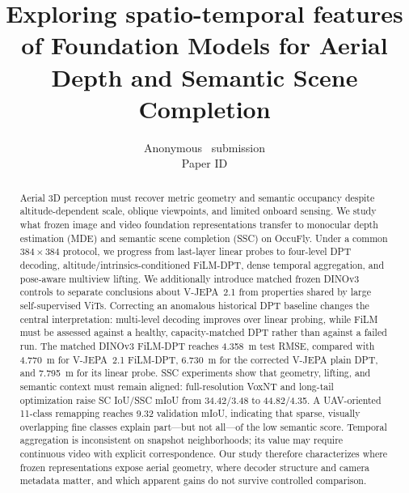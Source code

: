 \documentclass[10pt,twocolumn,letterpaper]{article}
\title{Exploring spatio-temporal features of Foundation Models for Aerial Depth and Semantic Scene Completion}
\author{Anonymous \confName~submission\\Paper ID \wacvPaperID}
\begin{document}
\maketitle
\begin{abstract}
Aerial 3D perception must recover metric geometry and semantic occupancy despite altitude-dependent scale, oblique viewpoints, and limited onboard sensing. We study what frozen image and video foundation representations transfer to monocular depth estimation (MDE) and semantic scene completion (SSC) on OccuFly. Under a common $384\!\times\!384$ protocol, we progress from last-layer linear probes to four-level DPT decoding, altitude/intrinsics-conditioned FiLM-DPT, dense temporal aggregation, and pose-aware multiview lifting. We additionally introduce matched frozen DINOv3 controls to separate conclusions about V-JEPA~2.1 from properties shared by large self-supervised ViTs. Correcting an anomalous historical DPT baseline changes the central interpretation: multi-level decoding improves over linear probing, while FiLM must be assessed against a healthy, capacity-matched DPT rather than against a failed run. The matched DINOv3 FiLM-DPT reaches 4.358~m test RMSE, compared with 4.770~m for V-JEPA~2.1 FiLM-DPT, 6.730~m for the corrected V-JEPA plain DPT, and 7.795~m for its linear probe. SSC experiments show that geometry, lifting, and semantic context must remain aligned: full-resolution VoxNT and long-tail optimization raise SC IoU/SSC mIoU from 34.42/3.48 to 44.82/4.35. A UAV-oriented 11-class remapping reaches 9.32 validation mIoU, indicating that sparse, visually overlapping fine classes explain part---but not all---of the low semantic score. Temporal aggregation is inconsistent on snapshot neighborhoods; its value may require continuous video with explicit correspondence. Our study therefore characterizes where frozen representations expose aerial geometry, where decoder structure and camera metadata matter, and which apparent gains do not survive controlled comparison.
\end{abstract}







\clearpage
\appendix




{\small


}
\end{document}
